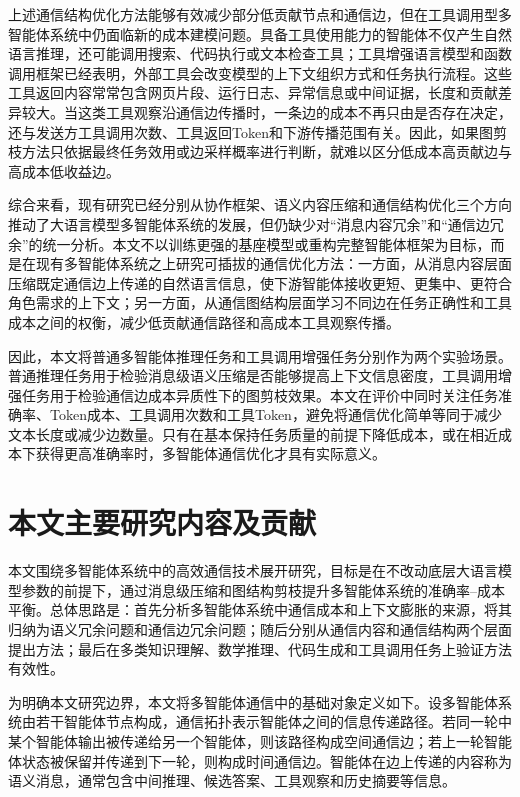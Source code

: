 上述通信结构优化方法能够有效减少部分低贡献节点和通信边，但在工具调用型多智能体系统中仍面临新的成本建模问题。具备工具使用能力的智能体不仅产生自然语言推理，还可能调用搜索、代码执行或文本检查工具；工具增强语言模型和函数调用框架已经表明，外部工具会改变模型的上下文组织方式和任务执行流程\cite{ref75,ref76,ref77}。这些工具返回内容常常包含网页片段、运行日志、异常信息或中间证据，长度和贡献差异较大。当这类工具观察沿通信边传播时，一条边的成本不再只由是否存在决定，还与发送方工具调用次数、工具返回Token和下游传播范围有关。因此，如果图剪枝方法只依据最终任务效用或边采样概率进行判断，就难以区分低成本高贡献边与高成本低收益边。

综合来看，现有研究已经分别从协作框架、语义内容压缩和通信结构优化三个方向推动了大语言模型多智能体系统的发展，但仍缺少对“消息内容冗余”和“通信边冗余”的统一分析。本文不以训练更强的基座模型或重构完整智能体框架为目标，而是在现有多智能体系统之上研究可插拔的通信优化方法：一方面，从消息内容层面压缩既定通信边上传递的自然语言信息，使下游智能体接收更短、更集中、更符合角色需求的上下文；另一方面，从通信图结构层面学习不同边在任务正确性和工具成本之间的权衡，减少低贡献通信路径和高成本工具观察传播。

因此，本文将普通多智能体推理任务和工具调用增强任务分别作为两个实验场景。普通推理任务用于检验消息级语义压缩是否能够提高上下文信息密度，工具调用增强任务用于检验通信边成本异质性下的图剪枝效果。本文在评价中同时关注任务准确率、Token成本、工具调用次数和工具Token，避免将通信优化简单等同于减少文本长度或减少边数量。只有在基本保持任务质量的前提下降低成本，或在相近成本下获得更高准确率时，多智能体通信优化才具有实际意义。

\section{本文主要研究内容及贡献}

本文围绕多智能体系统中的高效通信技术展开研究，目标是在不改动底层大语言模型参数的前提下，通过消息级压缩和图结构剪枝提升多智能体系统的准确率--成本平衡。总体思路是：首先分析多智能体系统中通信成本和上下文膨胀的来源，将其归纳为语义冗余问题和通信边冗余问题；随后分别从通信内容和通信结构两个层面提出方法；最后在多类知识理解、数学推理、代码生成和工具调用任务上验证方法有效性。

为明确本文研究边界，本文将多智能体通信中的基础对象定义如下。设多智能体系统由若干智能体节点构成，通信拓扑表示智能体之间的信息传递路径。若同一轮中某个智能体输出被传递给另一个智能体，则该路径构成空间通信边；若上一轮智能体状态被保留并传递到下一轮，则构成时间通信边。智能体在边上传递的内容称为语义消息，通常包含中间推理、候选答案、工具观察和历史摘要等信息。

